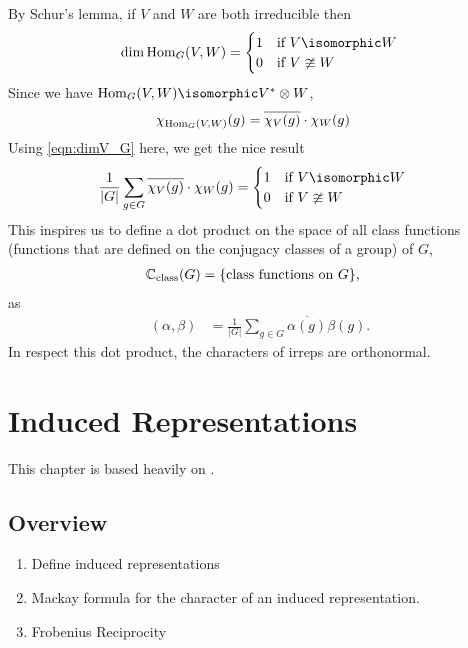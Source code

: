 By Schur's lemma, if $V$ and $W$ are both irreducible then
\begin{equation}
    \dim \Hom_G(V,W) = 
        \begin{cases}    
            1   &\text{if } V\isomorphic W \\
            0   &\text{if } V\ncong  W
        \end{cases}
\end{equation}
Since we have $\Hom_G(V,W)\isomorphic V^*\otimes W$,
\begin{align}
    \chi_{\operatorname{Hom}_G(V,W)}(g) &= \overline{\chi_V(g)}\cdot\chi_W(g)
\end{align}
Using \eqref{eqn:dimV_G} here, we get the nice result
\begin{align}
        \frac{1}{|G|}\sum_{g\in G} \overline{\chi_V(g)}\cdot\chi_W(g) 
        &= \begin{cases}    
            1   &\text{if } V\isomorphic W \\
            0   &\text{if } V\ncong  W
        \end{cases}
\end{align}
This inspires us to define a dot product on the space of all class functions (functions that are defined on the conjugacy classes of a group) of $G$,
\begin{align}
    \mathbb{C}_{\text{class}}(G) &= \{\text{class functions on $G$}\},
\end{align}
as
\begin{align}
    (\alpha,\beta) &= \frac{1}{|G|} \sum_{g\in G} \overline{\alpha(g)} \beta(g).
    \label{eqn:dotproduct_classfunctions}
\end{align}
In respect this dot product, the characters of irreps are orthonormal.

\chapter{Induced Representations}
\label{cha:induced_reprentations}

This chapter is based heavily on \cite{etingof_introduction_2009}.
\section{Overview}
\begin{enumerate}
    \makethislistcompact
    \item Define induced representations
    \item Mackay formula for the character of an induced representation.
    \item Frobenius Reciprocity
\end{enumerate}

